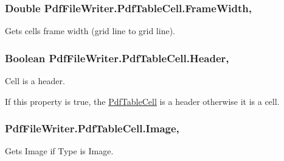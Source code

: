 \subsubsection[{\texorpdfstring{Frame\+Width}{FrameWidth}}]{\setlength{\rightskip}{0pt plus 5cm}Double Pdf\+File\+Writer.\+Pdf\+Table\+Cell.\+Frame\+Width\hspace{0.3cm}{\ttfamily [get]}, {\ttfamily [set]}}\hypertarget{class_pdf_file_writer_1_1_pdf_table_cell_ad3e6cb4db7db7f373cd4272a737e362c}{}\label{class_pdf_file_writer_1_1_pdf_table_cell_ad3e6cb4db7db7f373cd4272a737e362c}


Gets cell\textquotesingle{}s frame width (grid line to grid line). 

\subsubsection[{\texorpdfstring{Header}{Header}}]{\setlength{\rightskip}{0pt plus 5cm}Boolean Pdf\+File\+Writer.\+Pdf\+Table\+Cell.\+Header\hspace{0.3cm}{\ttfamily [get]}, {\ttfamily [set]}}\hypertarget{class_pdf_file_writer_1_1_pdf_table_cell_ae09ce38bc8ed67891972db098e74660f}{}\label{class_pdf_file_writer_1_1_pdf_table_cell_ae09ce38bc8ed67891972db098e74660f}


Cell is a header. 

If this property is true, the \hyperlink{class_pdf_file_writer_1_1_pdf_table_cell}{Pdf\+Table\+Cell} is a header otherwise it is a cell. 
\subsubsection[{\texorpdfstring{Image}{Image}}]{ Pdf\+File\+Writer.\+Pdf\+Table\+Cell.\+Image\hspace{0.3cm}{\ttfamily [get]}, {\ttfamily [set]}}\hypertarget{class_pdf_file_writer_1_1_pdf_table_cell_aae3e2b72c4d9cee9b656abdff40b13b8}{}\label{class_pdf_file_writer_1_1_pdf_table_cell_aae3e2b72c4d9cee9b656abdff40b13b8}


Gets Image if Type is Image. 

